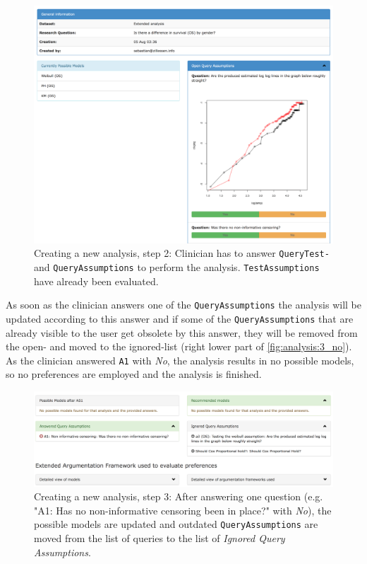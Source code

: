 \begin{figure}[t]
	\centering
	\includegraphics[width=\textwidth]{figures/ui_analysis_1}
	\caption{Creating a new analysis, step 2: Clinician has to answer \texttt{QueryTest-} and \texttt{QueryAssumptions} to perform the analysis. \texttt{TestAssumptions} have already been evaluated.}
	\label{fig:analysis:2}
\end{figure}


As soon as the clinician answers one of the \texttt{QueryAssumptions} the analysis will be updated according to this answer and if some of the \texttt{QueryAssumptions} that are already visible to the user get obsolete by this answer, they will be removed from the open- and moved to the ignored-list (right lower part of \autoref{fig:analysis:3_no}). 
As the clinician answered \texttt{A1} with \textit{No}, the analysis results in no possible models, so no preferences are employed and the analysis is finished.

\begin{figure}[t]
	\centering
	\includegraphics[width=\textwidth]{figures/ui_analysis_2_no}
	\caption{Creating a new analysis, step 3: After answering one question (e.g. "A1: Has no non-informative censoring been in place?" with \textit{No}), the possible models are updated and outdated \texttt{QueryAssumptions} are moved from the list of queries to the list of \textit{Ignored Query Assumptions}.}
	\label{fig:analysis:3_no}
\end{figure}

